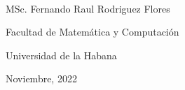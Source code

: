 \begin{opinion}	
	
	
	\vspace{1cm}
	
	
	\begin{flushright}
		\underline{\hspace{6.5cm}}\\
		MSc. Fernando Raul Rodriguez Flores
		
		Facultad de Matemática y Computación
		
		Universidad de la Habana
		
		Noviembre, 2022
	\end{flushright}

\end{opinion}